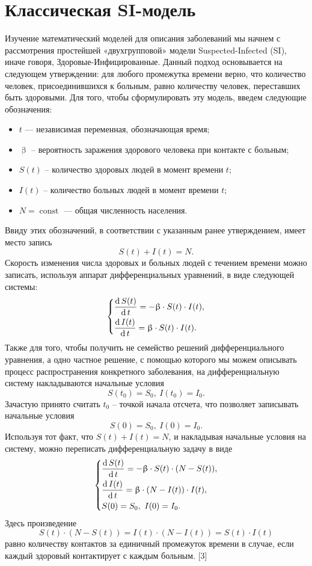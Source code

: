 \documentclass[a4paper, 14pt]{extreport}
\numberwithin{equation}{section}
\renewcommand{\beta}{\upbeta}
\renewcommand{\d}{\operatorname{d}}
\begin{document}
	\section{Классическая SI-модель}
	Изучение математический моделей для описания заболеваний мы начнем с рассмотрения простейшей «двухгрупповой» модели Suspected-Infected (SI), иначе говоря, Здоровые-Инфицированные.
	Данный подход основывается на следующем утверждении: для любого промежутка времени верно, что количество человек, присоединившихся к больным, равно количеству человек, переставших быть здоровыми. Для того, чтобы сформулировать эту модель, введем следующие обозначения:
	\begin{itemize}
		\item $t$ --- независимая переменная, обозначающая время;
		\item $\beta$ -- вероятность заражения здорового человека при контакте с больным;
		\item $S(t)$ -- количество здоровых людей в момент времени $t$; 
		\item $I(t)$ -- количество больных людей в момент времени $t$;
		\item $N = \operatorname{const}$ --- общая численность населения.
	\end{itemize}
	Ввиду этих обозначений, в соответствии с указанным ранее утверждением, имеет место запись $$S(t) + I(t) = N.$$
	Скорость изменения числа здоровых и больных людей с течением времени можно записать, используя аппарат дифференциальных уравнений, в виде следующей системы:
	\begin{eqnarray}
		\begin{dcases}
				\dfrac{\d S(t)}{\d t} = -\beta\cdot S(t)\cdot I(t),\\
				\dfrac{\d I(t)}{\d t} = \beta\cdot S(t)\cdot I(t).
		\end{dcases}
	\end{eqnarray}
	Также для того, чтобы получить не семейство решений дифференциального уравнения, а одно частное решение, с помощью которого мы можем описывать процесс распространения конкретного заболевания, на дифференциальную систему накладываются  начальные условия
	$$
		S(t_0) = S_0,\ I(t_0) = I_0.
	$$
	Зачастую принято считать $t_0$ -- точкой начала отсчета, что позволяет записывать начальные условия
	\begin{equation}
		S(0) = S_0,\ I(0) = I_0.
	\end{equation}
	Используя тот факт, что $S(t) + I(t) = N$,  и накладывая начальные условия на систему, можно переписать дифференциальную задачу в виде
	\begin{eqnarray}
		\begin{dcases}
		\dfrac{\d S(t)}{\d t} = -\beta \cdot S(t)\cdot (N - S(t)),\\
		\dfrac{\d I(t)}{\d t} = \beta\cdot (N - I(t))\cdot I(t),\\
		S(0) = S_0,\ I(0) = I_0.
		\end{dcases}
	\end{eqnarray}
	Здесь произведение 
	$$S(t) \cdot (N - S(t)) = I(t)\cdot (N - I(t)) = S(t)\cdot I(t)$$
	равно количеству контактов за единичный промежуток времени в случае, если каждый здоровый контактирует с каждым больным. [3]
	
\end{document}

